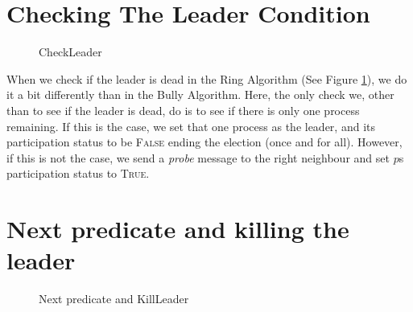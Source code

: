 \documentclass{report}
\begin{document}
\section{Checking The Leader Condition}
\begin{figure}
  \tlatex

\@x{}\moduleLeftDash{}\moduleRightDash\@xx{}%
%
%
%
%
%
%
%
%
\@xx{}%
\@x{}\bottombar\@xx{}%

  \caption{CheckLeader}
  \label{ringcheckleader}
  \end{figure}


When we check if the leader is dead in the Ring Algorithm (See Figure \ref{ringcheckleader}), we do it a bit differently than in the Bully Algorithm. Here, the only check we, other than to see if the leader is dead, do is to see if there is only one process remaining. If this is the case, we set that one process as the leader, and its participation status to be \textsc{False} ending the election (once and for all). However, if this is not the case, we send a \textit{probe} message to the right neighbour and set $p$s participation status to \textsc{True}.

\section{Next predicate and killing the leader}

\begin{figure}
\tlatex
\@x{}\moduleLeftDash{}\moduleRightDash\@xx{}%
%
%
\@pvspace{8.0pt}%
%
\@x{}\bottombar\@xx{}%

\caption{Next predicate and KillLeader}
\label{ringnextleader}
\end{figure}
\end{document}
